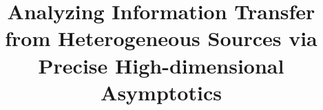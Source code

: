 \documentclass{article}
\begin{document}
	\title{Analyzing Information Transfer from Heterogeneous Sources via Precise High-dimensional Asymptotics}
	

	\maketitle
	
	
	
	
    
	
	
	
	
\end{document}

